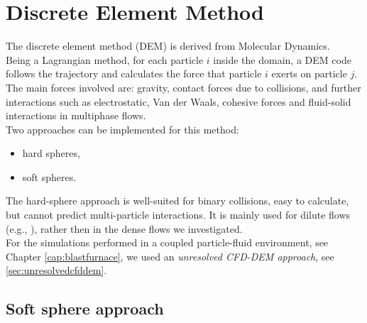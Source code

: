 
\chapter{Discrete Element Method}
\label{cap:dem}

The discrete element method (\acs{DEM}) is derived from Molecular Dynamics. \\ 
Being a Lagrangian method, for each particle $i$ inside the domain, a \acs{DEM}
code follows the trajectory and calculates the force that particle $i$ exerts on
particle $j$.
The main forces involved are: gravity, contact forces due to collisions, and
further interactions such as electrostatic, Van der Waals, cohesive forces and fluid-solid interactions in 
multiphase flows. \\
Two approaches can be implemented for this method:
\begin{itemize}
  \item{hard spheres,}
  \item{soft spheres.}
\end{itemize} 
The hard-sphere approach is well-suited for binary collisions, easy to
calculate, but cannot predict multi-particle interactions.
It is mainly used for dilute flows (e.g., \citet{RefWorks:122, RefWorks:151}),
rather then in the dense flows we investigated.\\
For the simulations performed in a coupled particle-fluid environment, see
Chapter \ref{cap:blastfurnace}, we used an \textit{unresolved
\acs{CFD}-\acs{DEM} approach}, see \ref{sec:unresolvedcfddem}.


\section{Soft sphere approach}
\label{sec:softspheresapproach}

